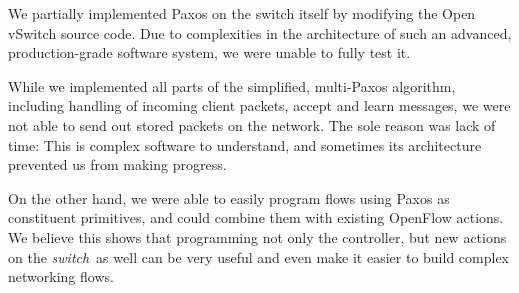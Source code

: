 We partially implemented Paxos on the switch itself by modifying the Open
vSwitch source code.  Due to complexities in the architecture of such an
advanced, production-grade software system, we were unable to fully test it.

While we implemented all parts of the simplified, multi-Paxos algorithm,
including handling of incoming client packets, accept and learn
messages, we were not able to send out stored packets on the network.
The sole reason was lack of time: This is complex software to understand,
and sometimes its architecture prevented us from making progress.

On the other hand, we were able to easily program flows using Paxos as
constituent primitives, and could combine them with existing OpenFlow
actions.  We believe this shows that programming not only the controller,
but new actions on the \textit{switch} as well can be very useful and even
make it easier to build complex networking flows.

